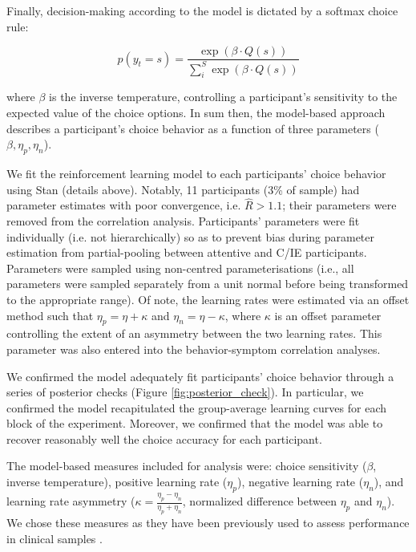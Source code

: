 \documentclass[a4paper,notitlepage,12pt]{article}
\begin{document}
\begin{refsection}[main]
Finally, decision-making according to the model is dictated by a softmax choice rule:

\begin{equation*}
    p(y_t = s) = \frac{\exp \left( \beta \cdot Q(s) \right)}{\sum_i^S \exp \left( \beta \cdot Q(s) \right)}
\end{equation*}

where $\beta$ is the inverse temperature, controlling a participant's sensitivity to the expected value of the choice options. In sum then, the model-based approach describes a participant's choice behavior as a function of three parameters ($\beta, \eta_p, \eta_n$). 

We fit the reinforcement learning model to each participants' choice behavior using Stan (details above). Notably, 11 participants (3\% of sample) had parameter estimates with poor convergence, i.e. $\hat{R} > 1.1$; their parameters were removed from the correlation analysis. Participants' parameters were fit individually (i.e. not hierarchically) so as to prevent bias during parameter estimation from partial-pooling between attentive and C/IE participants. Parameters were sampled using non-centred parameterisations (i.e., all parameters were sampled separately from a unit normal before being transformed to the appropriate range). Of note, the learning rates were estimated via an offset method such that $\eta_p = \eta + \kappa$ and $\eta_n = \eta - \kappa$, where $\kappa$ is an offset parameter controlling the extent of an asymmetry between the two learning rates. This parameter was also entered into the behavior-symptom correlation analyses. 

We confirmed the model adequately fit participants' choice behavior through a series of posterior checks (Figure \ref{fig:posterior_check}). In particular, we confirmed the model recapitulated the group-average learning curves for each block of the experiment. Moreover, we confirmed that the model was able to recover reasonably well the choice accuracy for each participant.

The model-based measures included for analysis were: choice sensitivity ($\beta$,  inverse temperature), positive learning rate ($\eta_p$), negative learning rate ($\eta_n$), and learning rate asymmetry ($\kappa = \frac{\eta_p-\eta_n}{\eta_p+\eta_n}$, normalized difference between $\eta_p$ and $\eta_n$). We chose these measures as they have been previously used to assess performance in clinical samples \cite{huang2017computational, brolsma2020challenging, mukherjee_reward_2020, ritschel2017neural}. 


\end{refsection}
\end{document}
